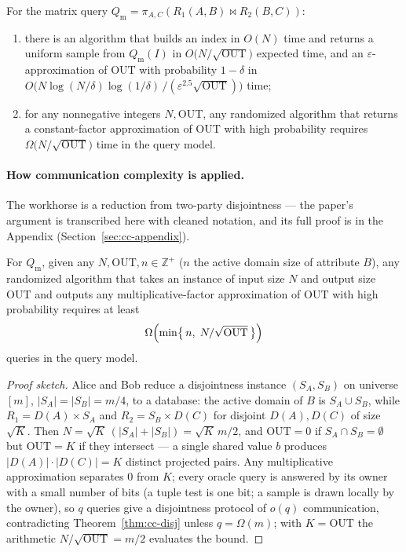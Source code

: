 \begin{theorem}\label{thm:cc-jp-matrix}
For the matrix query $Q_{\mathrm{m}} = \pi_{A,C}(R_1(A,B) \Join R_2(B,C))$:
\begin{enumerate}
\item[(i)] there is an algorithm that builds an index in $O(N)$ time and returns a
  uniform sample from $Q_{\mathrm{m}}(I)$ in $O\bigl(N/\sqrt{\mathrm{OUT}}\bigr)$
  expected time, and an $\varepsilon$-approximation of $\mathrm{OUT}$ with
  probability $1-\delta$ in $O\bigl(N \log(N/\delta)\log(1/\delta) \,/
  (\varepsilon^{2.5}\sqrt{\mathrm{OUT}})\bigr)$ time;
\item[(ii)] for any nonnegative integers $N, \mathrm{OUT}$, any randomized algorithm
  that returns a constant-factor approximation of $\mathrm{OUT}$ with high
  probability requires $\Omega\bigl(N/\sqrt{\mathrm{OUT}}\bigr)$ time in the query
  model.
\end{enumerate}
\eop
\end{theorem}

\paragraph{How communication complexity is applied.}
The workhorse is a reduction from two-party disjointness --- the paper's argument is
transcribed here with cleaned notation, and its full proof is in the
Appendix (Section~\ref{sec:cc-appendix}).

\begin{lemma}\label{lem:cc-243-reduction}
For $Q_{\mathrm{m}}$, given any $N, \mathrm{OUT}, n \in \mathbb{Z}^+$ ($n$ the active
domain size of attribute $B$), any randomized algorithm that takes an instance of
input size $N$ and output size $\mathrm{OUT}$ and outputs any multiplicative-factor
approximation of $\mathrm{OUT}$ with high probability requires at least
\[
\Omega\Bigl(\min\bigl\{\,n,\; N/\sqrt{\mathrm{OUT}}\,\bigr\}\Bigr)
\]
queries in the query model. \eop
\end{lemma}

\begin{proof}[Proof sketch]
Alice and Bob reduce a disjointness instance $(S_A, S_B)$ on universe $[m]$,
$|S_A| = |S_B| = m/4$, to a database: the active domain of $B$ is $S_A \cup S_B$,
while $R_1 = D(A) \times S_A$ and $R_2 = S_B \times D(C)$ for disjoint $D(A), D(C)$
of size $\sqrt{K}$. Then $N = \sqrt{K}\,(|S_A| + |S_B|) = \sqrt{K}\,m/2$, and
$\mathrm{OUT} = 0$ if $S_A \cap S_B = \emptyset$ but $\mathrm{OUT} = K$ if they
intersect --- a single shared value $b$ produces $|D(A)| \cdot |D(C)| = K$ distinct
projected pairs. Any multiplicative approximation separates $0$ from $K$; every
oracle query is answered by its owner with a small number of bits (a tuple test is
one bit; a sample is drawn locally by the owner), so $q$ queries give a disjointness
protocol of $o(q)$ communication, contradicting Theorem~\ref{thm:cc-disj} unless
$q = \Omega(m)$; with $K = \mathrm{OUT}$ the arithmetic
$N/\sqrt{\mathrm{OUT}} = m/2$ evaluates the bound.
\end{proof}

